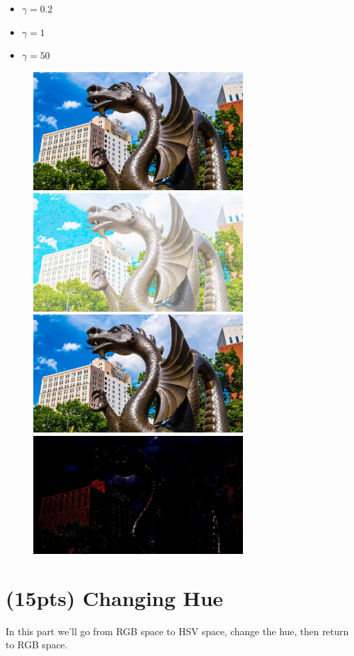 \documentclass[12pt]{article}
\begin{document}
\begin{itemize}
\item $\gamma=0.2$
\item $\gamma=1$
\item $\gamma=50$
\end{itemize}

\begin{figure}[htp]
    \centering
    \includegraphics[width=8cm]{input_1.jpg}
    \includegraphics[width=8cm]{gamma_0.2.jpg}
    \includegraphics[width=8cm]{gamma_1.jpg}
    \includegraphics[width=8cm]{gamma_50.jpg}
\end{figure}

\newpage
\section{(15pts) Changing Hue}
In this part we'll go from RGB space to HSV space, change the hue, then return to RGB space.\\
\end{document}
